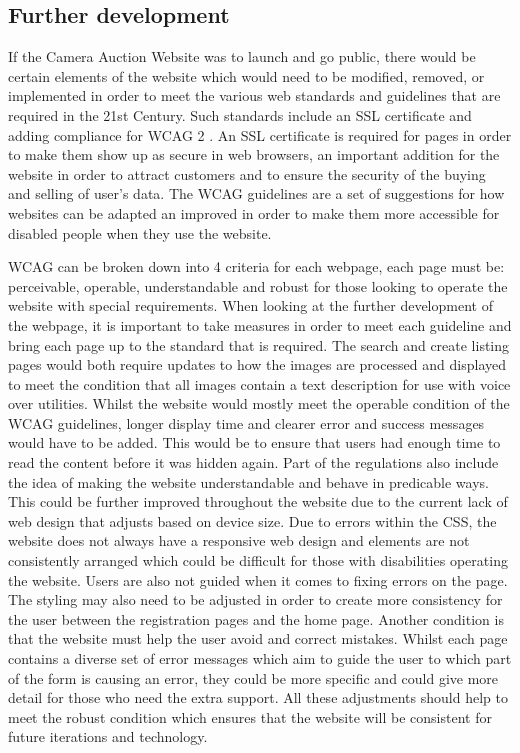 \subsection{Further development} 
If the Camera Auction Website was to launch and go public, there would be certain elements of the website which would need to be modified, removed, or implemented in order to meet the various web standards and guidelines that are required in the 21st Century. Such standards include an SSL certificate \parencite{ssl} and adding compliance for WCAG 2 \parencite{w3c_accessibility_standards}. An SSL certificate is required for pages in order to make them show up as secure in web browsers, an important addition for the website in order to attract customers and to ensure the security of the buying and selling of user’s data. The WCAG guidelines are a set of suggestions for how websites can be adapted an improved in order to make them more accessible for disabled people when they use the website. 

WCAG can be broken down into 4 criteria for each webpage, each page must be: perceivable, operable, understandable and robust for those looking to operate the website with special requirements. When looking at the further development of the webpage, it is important to take measures in order to meet each guideline and bring each page up to the standard that is required. The search and create listing pages would both require updates to how the images are processed and displayed to meet the condition that all images contain a text description for use with voice over utilities. Whilst the website would mostly meet the operable condition of the WCAG guidelines, longer display time and clearer error and success messages would have to be added. This would be to ensure that users had enough time to read the content before it was hidden again. Part of the regulations also include the idea of making the website understandable and behave in predicable ways. This could be further improved throughout the website due to the current lack of web design that adjusts based on device size. Due to errors within the CSS, the website does not always have a responsive web design and elements are not consistently arranged which could be difficult for those with disabilities operating the website. Users are also not guided when it comes to fixing errors on the page. The styling may also need to be adjusted in order to create more consistency for the user between the registration pages and the home page. Another condition is that the website must help the user avoid and correct mistakes. Whilst each page contains a diverse set of error messages which aim to guide the user to which part of the form is causing an error, they could be more specific and could give more detail for those who need the extra support. All these adjustments should help to meet the robust condition which ensures that the website will be consistent for future iterations and technology.

